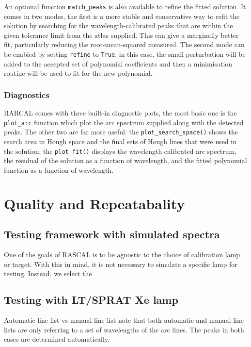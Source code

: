 \documentclass{aa}
\begin{document}
An optional function \texttt{match\_peaks} is also available to refine the
fitted solution. It comes in two modes, the first is a more stable and
conservative way to refit the solution by searching for the wavelength-calibrated
peaks that are within the given tolerance limit from the atlas supplied. This
can give a marginally better fit, particularly reducing the root-mean-squared
measured. The second mode can be enabled by setting \texttt{refine} to
\texttt{True}, in this case, the small perturbation will be added to the accepted
set of polynomial coefficients and then a minimisation routine will be used to
fit for the new polynomial.

\subsubsection*{Diagnostics}
\textsc{RARCAL} comes with three built-in diagnostic plots, the most basic
one is the \texttt{plot\_arc} function which plot the arc spectrum
supplied along with the detected peaks. The other two are far more useful:
the \texttt{plot\_search\_space()} shows the search area in Hough space and
the final sets of Hough lines that were used in the solution; the
\texttt{plot\_fit()} displays the wavelength calibrated arc spectrum, the
residual of the solution as a function of wavelength, and the fitted polynomial
function as a function of wavelength.

\section{Quality and Repeatabality}

\subsection{Testing framework with simulated spectra}

One of the goals of RASCAL is to be agnostic to the choice of calibration lamp or target. With 
this in mind, it is not necessary to simulate a specific lamp for testing. Instead, we select
the 


\subsection{Testing with LT/SPRAT Xe lamp}

Automatic line list vs manual line list
note that both automatic and manual line lists are only referring to a set of wavelengths of the arc lines. The peaks in both cases are determined automatically.
\end{document}

